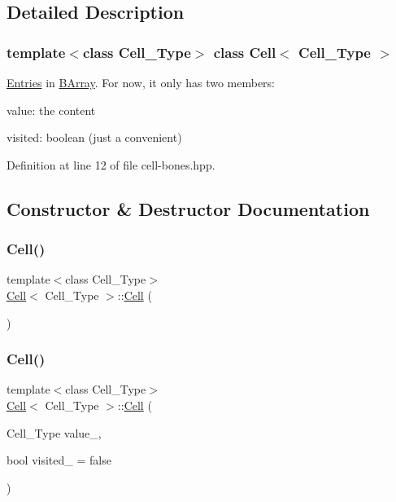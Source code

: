 \subsection{Detailed Description}
\subsubsection*{template$<$class Cell\+\_\+\+Type$>$\newline
class Cell$<$ Cell\+\_\+\+Type $>$}

\hyperlink{class_entries}{Entries} in \hyperlink{class_b_array}{B\+Array}. For now, it only has two members\+: 


\begin{DoxyItemize}
\item value\+: the content
\item visited\+: boolean (just a convenient) 
\end{DoxyItemize}

Definition at line 12 of file cell-\/bones.\+hpp.



\subsection{Constructor \& Destructor Documentation}
\mbox{\label{class_cell_a402912c21a4c87659c0576a4bfa3c48f}} 
\subsubsection{\texorpdfstring{Cell()}{Cell()}\hspace{0.1cm}{\footnotesize\ttfamily [1/9]}}
{\footnotesize\ttfamily template$<$class Cell\+\_\+\+Type$>$ \\
\hyperlink{class_cell}{Cell}$<$ Cell\+\_\+\+Type $>$\+::\hyperlink{class_cell}{Cell} (\begin{DoxyParamCaption}{ }\end{DoxyParamCaption})}

\mbox{\label{class_cell_a6592b5fcfc80001c8de64a2e722ca715}} 
\subsubsection{\texorpdfstring{Cell()}{Cell()}\hspace{0.1cm}{\footnotesize\ttfamily [2/9]}}
{\footnotesize\ttfamily template$<$class Cell\+\_\+\+Type$>$ \\
\hyperlink{class_cell}{Cell}$<$ Cell\+\_\+\+Type $>$\+::\hyperlink{class_cell}{Cell} (\begin{DoxyParamCaption}\item[{Cell\+\_\+\+Type}]{value\+\_\+,  }\item[{bool}]{visited\+\_\+ = {\ttfamily false} }\end{DoxyParamCaption})\hspace{0.3cm}{\ttfamily [inline]}}




